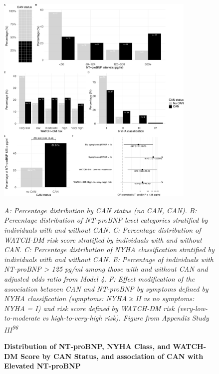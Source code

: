 \documentclass[
  a4paper,
  headsepline=true,
  open=left]{scrbook}
\begin{document}
\begin{figure}

{\centering 

\includegraphics[width=0.85\textwidth,height=\textheight]{images/heart_failure_distribution_can_figure_2_2.pdf}

\emph{A: Percentage distribution by CAN status (no CAN, CAN). B:
Percentage distribution of NT-proBNP level categories stratified by
individuals with and without CAN. C: Percentage distribution of WATCH-DM
risk score stratified by individuals with and without CAN. C: Percentage
distribution of NYHA classification stratified by individuals with and
without CAN. E: Percentage of individuals with NT-proBNP \textgreater{}
125 pg/ml among those with and without CAN and adjusted odds ratio from
Model 4. F: Effect modification of the association between CAN and
NT-proBNP by symptoms defined by NYHA classification (symptoms: NYHA ≥
II vs no symptoms: NYHA = I) and risk score defined by WATCH-DM risk
(very-low-to-moderate vs high-to-very-high risk). Figure from Appendix
Study III\textsuperscript{96}}

}

\caption{\label{fig-CAN}\textbf{Distribution of NT-proBNP, NYHA Class,
and WATCH-DM Score by CAN Status, and association of CAN with Elevated
NT-proBNP}}

\end{figure}

\restoregeometry
\end{document}
